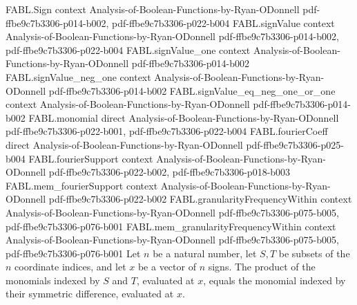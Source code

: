 \begin{theorem}
\label{FABL.monomial_mul_monomial}
\leanok
{}
\proofstep
  {FABL.Sign}
  {context}
  {Analysis-of-Boolean-Functions-by-Ryan-ODonnell}
  {pdf-ffbe9c7b3306-p014-b002,
    pdf-ffbe9c7b3306-p022-b004}
\proofstep
  {FABL.signValue}
  {context}
  {Analysis-of-Boolean-Functions-by-Ryan-ODonnell}
  {pdf-ffbe9c7b3306-p014-b002,
    pdf-ffbe9c7b3306-p022-b004}
\proofstep
  {FABL.signValue_one}
  {context}
  {Analysis-of-Boolean-Functions-by-Ryan-ODonnell}
  {pdf-ffbe9c7b3306-p014-b002}
\proofstep
  {FABL.signValue_neg_one}
  {context}
  {Analysis-of-Boolean-Functions-by-Ryan-ODonnell}
  {pdf-ffbe9c7b3306-p014-b002}
\proofstep
  {FABL.signValue_eq_neg_one_or_one}
  {context}
  {Analysis-of-Boolean-Functions-by-Ryan-ODonnell}
  {pdf-ffbe9c7b3306-p014-b002}
\proofstep
  {FABL.monomial}
  {direct}
  {Analysis-of-Boolean-Functions-by-Ryan-ODonnell}
  {pdf-ffbe9c7b3306-p022-b001,
    pdf-ffbe9c7b3306-p022-b004}
\proofstep
  {FABL.fourierCoeff}
  {direct}
  {Analysis-of-Boolean-Functions-by-Ryan-ODonnell}
  {pdf-ffbe9c7b3306-p025-b004}
\proofstep
  {FABL.fourierSupport}
  {context}
  {Analysis-of-Boolean-Functions-by-Ryan-ODonnell}
  {pdf-ffbe9c7b3306-p022-b002,
    pdf-ffbe9c7b3306-p018-b003}
\proofstep
  {FABL.mem_fourierSupport}
  {context}
  {Analysis-of-Boolean-Functions-by-Ryan-ODonnell}
  {pdf-ffbe9c7b3306-p022-b002}
\proofstep
  {FABL.granularityFrequencyWithin}
  {context}
  {Analysis-of-Boolean-Functions-by-Ryan-ODonnell}
  {pdf-ffbe9c7b3306-p075-b005,
    pdf-ffbe9c7b3306-p076-b001}
\proofstep
  {FABL.mem_granularityFrequencyWithin}
  {context}
  {Analysis-of-Boolean-Functions-by-Ryan-ODonnell}
  {pdf-ffbe9c7b3306-p075-b005,
    pdf-ffbe9c7b3306-p076-b001}
Let $n$ be a natural number, let $S,T$ be subsets of the $n$ coordinate indices, and let
$x$ be a vector of $n$ signs. The product of the monomials indexed by $S$ and $T$,
evaluated at $x$, equals the monomial indexed by their symmetric difference, evaluated
at $x$.
\end{theorem}

